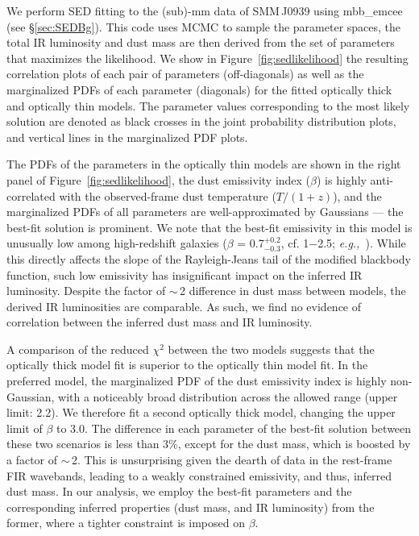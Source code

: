 \documentclass[iop, revtex4]{emulateapj}
\newcommand{\eg}{{\sl e.g.,~}}
\begin{document}
\clearpage
\begin{turnpage}

\clearpage
\end{turnpage}


\appendix
We perform SED fitting to the (sub)-mm data of SMM\,J0939 using {\sc mbb\_emcee} (see \S \ref{sec:SEDBg}). This code uses MCMC to sample the parameter spaces, the total IR luminosity and dust mass are then derived from the set of parameters that maximizes the likelihood.
We show in Figure~\ref{fig:sedlikelihood} the resulting correlation plots of each pair of parameters (off-diagonals) as well as the marginalized PDFs of each parameter (diagonals) for the fitted optically thick and optically thin models.
The parameter values corresponding to the most likely solution are denoted as black crosses in the joint probability distribution plots, and vertical lines in the marginalized PDF plots. \par

The PDFs of the parameters in the optically thin models are shown in the right panel of Figure~\ref{fig:sedlikelihood}, the dust emissivity index ($\beta$) is highly anti-correlated with the observed-frame dust temperature ($T/(1+z)$), and the marginalized PDFs of all parameters are well-approximated by Gaussians --- the best-fit solution is prominent.
We note that the best-fit emissivity in this model is unusually low among high-redshift galaxies ($\beta$ = 0.7$^{+0.2}_{-0.3}$, cf. 1$-$2.5; \eg \citealt[][and references therein]{Casey12a}). While this directly affects the slope of the Rayleigh-Jeans tail of the modified blackbody function, such low emissivity has insignificant impact on the inferred IR luminosity.
Despite the factor of $\sim$\,2 difference
in dust mass
between models, the derived IR luminosities are comparable. As such, we find no evidence of correlation between the inferred dust mass and IR luminosity.

A comparison of the reduced $\chi^2$ between the two models suggests that the optically thick model fit is superior to the optically thin model fit. In the preferred model, the marginalized PDF of the dust emissivity index is highly non-Gaussian, with a noticeably broad distribution across
the allowed range (upper limit: 2.2). We therefore fit a second optically thick model, changing the upper limit of $\beta$ to 3.0. The difference in each
parameter of the best-fit solution between these two scenarios is less than 3\%, except for the dust mass, which is boosted by a factor of $\sim$\,2. This is
unsurprising given the dearth of data in the rest-frame FIR wavebands, leading to a weakly constrained emissivity, and thus, inferred dust mass.
In our analysis, we employ the best-fit parameters and the corresponding inferred properties (dust mass, and IR luminosity) from the former, where a tighter constraint is imposed on $\beta$.
\end{document}
